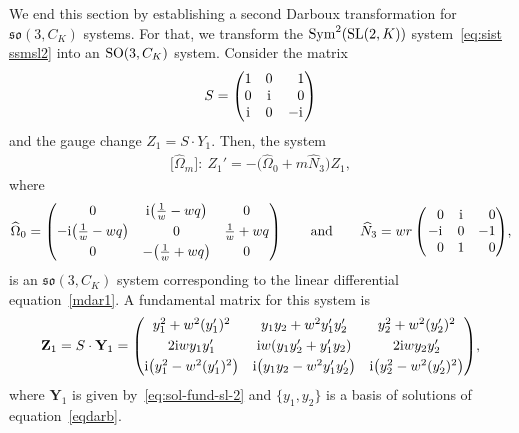 \documentclass[10pt,a4paper]{amsart}
\numberwithin{equation}{section}
\def\Sym{\mathrm{Sym}}
\begin{document}
We end this section by establishing a second Darboux transformation for $\mathfrak{so}(3, C_K)$ systems. For that, we transform the $\Sym^2 ({\rm SL}(2,K))$ system~\eqref{eq:sist ssmsl2} into an
${\rm SO}(3, C_K)$ system. Consider the matrix
\begin{gather*}
S = \begin{pmatrix} 1&0&\hphantom{-}1 \\ 0&{\rm i}&\hphantom{-}0\\ {\rm i}&0&-{\rm i}\end{pmatrix}
\end{gather*}
and the gauge change $Z_1= S \cdot Y_1 $. Then, the system
\begin{gather}\label{eq:so-system-2}
 \big[\widehat{\Omega}_m\big]\colon \ Z_1' = - \big(\widehat{\Omega}_0 + m \widehat{N}_3 \big) Z_1,
\end{gather}
where
\begin{gather*}%
 \widehat{\Omega}_0 = \begin{pmatrix}
 0 & {\rm i} \big(\frac{1}{w} - wq \big) & 0 \vspace{1mm}\\
 -{\rm i} \big(\frac{1}{w} - wq \big) & 0 & \frac{1}{w} + wq \vspace{1mm}\\
 0 & - \big(\frac{1}{w} + wq \big) & 0 \end{pmatrix} \qquad \text{and} \qquad
 \widehat{N}_3 = wr \begin{pmatrix}
 \hphantom{-}0 & {\rm i} & \hphantom{-}0 \\ -{\rm i} & 0 & -1 \\ \hphantom{-}0 & 1 & \hphantom{-}0
 \end{pmatrix}\!,
\end{gather*}
is an $\mathfrak{so}(3, C_K)$ system corresponding to the linear differential equation~\eqref{mdar1}. A fundamental matrix for this system is
 \begin{gather}\label{eq:sol-fund-so3-2}
 \mathbf{Z}_1 = S \cdot \mathbf{Y}_1 = \begin{pmatrix}
 y_1^2 +w^2 (y_1')^2 & y_1 y_2 + w^2 y_1' y_2' & y_2^2 + w^2 (y_2')^2 \vspace{1mm}\\
 2{\rm i}w y_1 y_1' & {\rm i}w (y_1 y_2' + y_1' y_2) & 2{\rm i}w y_2 y_2' \vspace{1mm}\\
 {\rm i}\big(y_1^2 - w^2 (y_1')^2\big) & {\rm i}\big(y_1 y_2 - w^2 y_1' y_2'\big) & {\rm i}\big(y_2^2 - w^2 (y_2')^2\big)
\end{pmatrix}\!,
 \end{gather}
 where $\mathbf{Y}_1$ is given by~\eqref{eq:sol-fund-sl-2} and $\{ y_1, y_2 \}$ is a basis of solutions of equation~\eqref{eqdarb}.
\end{document}
